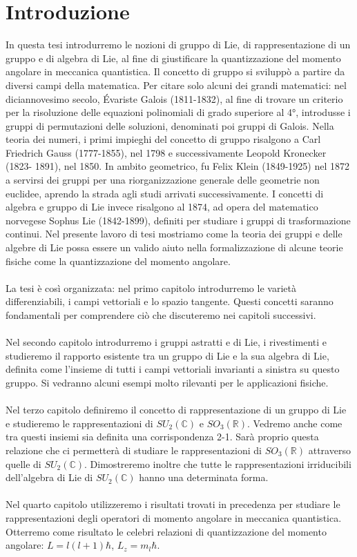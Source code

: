 \documentclass[12pt,a4paper]{report}
\theoremstyle{definition}
\theoremstyle{Theorem}
\theoremstyle{definition}
\theoremstyle{definition}
\theoremstyle{definition}
\begin{document}
	\chapter*{Introduzione}
	In questa tesi introdurremo le nozioni di gruppo di Lie, di rappresentazione di un gruppo e di algebra di Lie, al fine di giustificare la quantizzazione del momento angolare in meccanica quantistica. Il concetto di gruppo si sviluppò a partire da diversi campi della matematica. Per citare solo alcuni dei grandi matematici: nel diciannovesimo secolo, Évariste Galois (1811-1832), al fine di trovare un criterio per la risoluzione delle equazioni polinomiali di grado superiore al 4°, introdusse i gruppi di permutazioni delle soluzioni, denominati poi gruppi di Galois. Nella teoria dei numeri, i primi impieghi del concetto di gruppo risalgono a Carl Friedrich Gauss (1777-1855), nel 1798 e successivamente Leopold Kronecker (1823-
	1891), nel 1850. In ambito geometrico, fu Felix Klein (1849-1925) nel 1872 a servirsi dei gruppi per una riorganizzazione generale delle geometrie non euclidee, aprendo la strada agli studi arrivati successivamente. I concetti di algebra e gruppo di Lie invece risalgono al 1874, ad opera del matematico norvegese Sophus Lie (1842-1899), definiti per studiare i gruppi di trasformazione continui.
	Nel presente lavoro di tesi mostriamo come la teoria dei gruppi e delle algebre di Lie possa essere un valido aiuto nella formalizzazione di alcune teorie fisiche come la quantizzazione del momento angolare.
	\\
	\\
	La tesi è così organizzata:
	nel primo capitolo introdurremo le varietà differenziabili, i campi vettoriali e lo spazio tangente. Questi concetti saranno fondamentali per comprendere ciò che discuteremo nei capitoli successivi.\\
	\\
	Nel secondo capitolo introdurremo i gruppi astratti e di Lie, i rivestimenti e studieremo il rapporto esistente tra un gruppo di Lie e la sua algebra di Lie, definita come l'insieme di tutti i campi vettoriali invarianti a sinistra su questo gruppo. Si vedranno alcuni esempi molto rilevanti per le applicazioni fisiche.\\
	\\
	Nel terzo capitolo definiremo il concetto di rappresentazione di un gruppo di Lie e studieremo le rappresentazioni di $SU_2(\mathbb{C})$ e $SO_3(\mathbb{R})$. Vedremo anche come tra questi insiemi sia definita una corrispondenza 2-1. Sarà proprio questa relazione che ci permetterà di studiare le rappresentazioni di $SO_3(\mathbb{R})$ attraverso quelle di $SU_2(\mathbb{C})$. Dimostreremo inoltre che tutte le rappresentazioni irriducibili dell'algebra di Lie di $SU_2(\mathbb{C})$ hanno una determinata forma.\\
	\\
	Nel quarto capitolo utilizzeremo i risultati trovati in precedenza per studiare le rappresentazioni degli operatori di momento angolare in meccanica quantistica. Otterremo come risultato le celebri relazioni di quantizzazione del momento angolare: $L=l(l+1)\hbar$, $L_z=m_l\hbar$.
\end{document}
